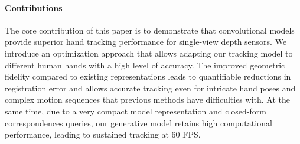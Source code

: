 \paragraph{Contributions}
%
The core contribution of this paper is to demonstrate that convolutional models provide superior hand tracking performance for single-view depth  sensors.  We introduce an optimization approach that allows adapting our tracking model to different human hands with a high level of accuracy. 
The improved geometric fidelity compared to existing representations leads to quantifiable reductions in registration error and allows accurate tracking even for intricate hand poses and complex motion sequences that previous methods have difficulties with. 
At the same time, due to a very compact model representation and closed-form correspondences queries, our generative model retains high computational performance, leading to sustained tracking at 60 FPS.



